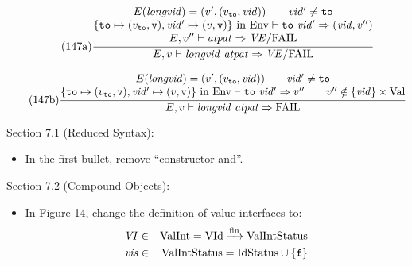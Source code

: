 \documentclass[twoside,titlepage]{article}
\newcommand{\finto}{\ensuremath{\xrightarrow{\text{fin}}}}
\begin{document}
\begin{appendix}
\begin{itemize}
  \begin{equation}
  \tag{147a}
  \frac{
  \begin{array}{@{}c@{}}
  E(\mathit{longvid}) = (v', (v_{\tt{to}},\mathit{vid}))
  \qquad
  \mathit{vid'} \neq {\tt{to}}
  \\
  \mbox{$\{{\tt{to}}\mapsto(v_{\tt{to}},{\tt{v}}), \mathit{vid'}\mapsto(v,{\tt{v}})\}$ in Env} \vdash {\tt{to}}~\mathit{vid'} \Rightarrow (\mathit{vid},v'')
  \\
  E,v'' \vdash \mathit{atpat} \Rightarrow \mathit{VE}/\mbox{FAIL}
  \end{array}
  }{
  E,v \vdash \mathit{longvid}~\mathit{atpat} \Rightarrow \mathit{VE}/\mbox{FAIL}
  }
  \end{equation}


  \begin{equation}
  \tag{147b}
  \frac{
  \begin{array}{@{}c@{}}
  E(\mathit{longvid}) = (v', (v_{\tt{to}},\mathit{vid}))
  \qquad
  \mathit{vid'} \neq {\tt{to}}
  \\
  \mbox{$\{{\tt{to}}\mapsto(v_{\tt{to}},{\tt{v}}), \mathit{vid'}\mapsto(v,{\tt{v}})\}$ in Env} \vdash {\tt{to}}~\mathit{vid'} \Rightarrow v''
  \qquad
  v'' \notin \{\mathit{vid}\}\times\mbox{Val}
  \end{array}
  }{
  E,v \vdash \mathit{longvid}~\mathit{atpat} \Rightarrow \mbox{FAIL}
  }
  \end{equation}
\end{itemize}

Section 7.1 (Reduced Syntax):
\begin{itemize}
\item In the first bullet, remove ``constructor and''.
\end{itemize}

Section 7.2 (Compound Objects):
\begin{itemize}
\item In Figure 14, change the definition of value interfaces to:
  \begin{eqnarray*}
  \mathit{VI} &\in& \mbox{ValInt} = \mbox{VId} \finto \mbox{ValIntStatus} \\
  \mathit{vis} &\in& \mbox{ValIntStatus} = \mbox{IdStatus} \cup \{{\tt{f}}\}
  \end{eqnarray*}


\end{itemize}
\end{appendix}
\end{document}
